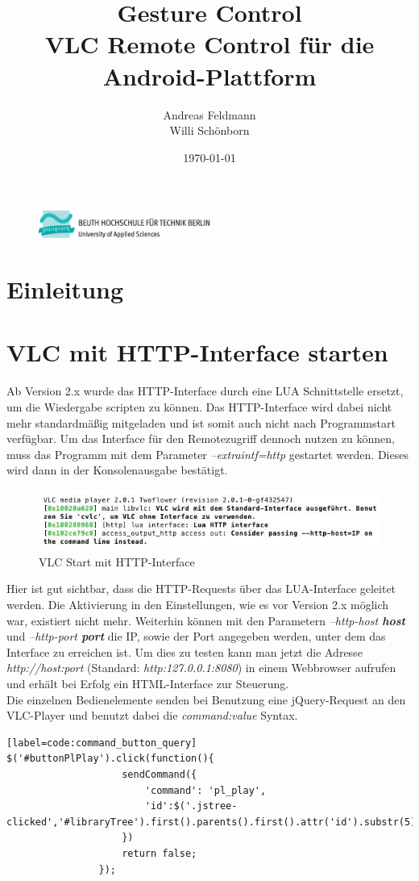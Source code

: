 \documentclass[a4paper]{article}
\title{Gesture Control \\ VLC Remote Control für die Android-Plattform}
\author{Andreas Feldmann \\ Willi Schönborn}
\date{\today}
\begin{document}
\begin{figure}[H]
\centering
\includegraphics[width=0.5\textwidth]{beuth.eps}
\maketitle
\end{figure}

\section*{Einleitung}
\section*{VLC mit HTTP-Interface starten}
Ab Version 2.x wurde das HTTP-Interface durch eine LUA Schnittstelle ersetzt, um die Wiedergabe scripten zu können. Das HTTP-Interface wird dabei nicht mehr standardmäßig mitgeladen und ist somit auch nicht nach Programmstart verfügbar. Um das Interface für den Remotezugriff dennoch nutzen zu können,  muss das Programm mit dem Parameter \textit{--extraintf=http} gestartet werden. Dieses wird dann in der Konsolenausgabe bestätigt. \\

\begin{figure}[H]
\centering
\includegraphics[width=\textwidth]{res/cli-output.jpg}
\caption{VLC Start mit HTTP-Interface}
\label{fig:vlc-start-with-param}
\end{figure}
Hier ist gut sichtbar, dass die HTTP-Requests über das LUA-Interface geleitet werden. Die Aktivierung in den Einstellungen, wie es vor Version 2.x möglich war, existiert nicht mehr. Weiterhin können mit den Parametern  \textit{--http-host \textbf{host}} und \textit{--http-port \textbf{port}} die IP, sowie der Port angegeben werden, unter dem das Interface zu erreichen ist. Um dies zu testen kann man jetzt die Adresse \textit{http://host:port} (Standard: \textit{http:127.0.0.1:8080}) in einem Webbrowser aufrufen und erhält bei Erfolg ein HTML-Interface zur Steuerung. \\
Die einzelnen Bedienelemente senden bei Benutzung eine jQuery-Request an den VLC-Player und benutzt dabei die \textit{command:value} Syntax.
\begin{lstlisting}[caption=Play Button Command][label=code:command_button_query]
$('#buttonPlPlay').click(function(){
					sendCommand({
						'command': 'pl_play',
						'id':$('.jstree-clicked','#libraryTree').first().parents().first().attr('id').substr(5)
					})
					return false;
				});
\end{lstlisting}
\end{document}

